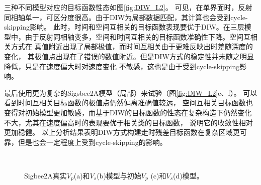 三种不同模型对应的目标函数性态如图\ref{fig:DIW_L2}。
可见，在单界面时，反射同相轴单一，可区分度很高。由于DIW为局部数据匹配，其计算也会受到cycle-skipping影响。
此时，时间和空间互相关的目标函数表现要优于DIW。在三层模型中，由于反射同相轴变多，空间和时间互相关的目标函数准确性下降。空间互相关方式在
真值附近出现了局部极值，而时间互相关由于更难反映出时差随深度的变化，
其极值点出现在了错误的数值附近。但是DIW方式的稳定性并未随之明显降低，只是在速度偏大时对速度变化
不敏感，这也是由于受到cycle-skipping影响。

最后使用更为复杂的Sigsbee2A模型（局部）来试验（图\ref{fig:DIW_L2}e、f）。
可以看到时间互相关目标函数的极值点仍然偏离准确值较远，
空间互相关目标函数也变得对初始模型更加敏感，而基于DIW的目标函数的性态在复杂构造下仍然变化不大，尤其在速度偏高时的表现要优于相关类的目标函数，
说明它的收敛性相对更加稳健。
以上分析结果表明DIW方式构建走时残差目标函数在复杂区域更可靠，但是也会一定程度上受到cycle-skipping的影响。

\begin{figure}[!htb]
   \centering
   \\
   \caption{Sigbee2A真实$V_p$(a)和$V_s$(b)模型与初始$V_p$ (c)和$V_s$(d)模型。}
   \label{fig:TrueAndInitial}
\end{figure}
